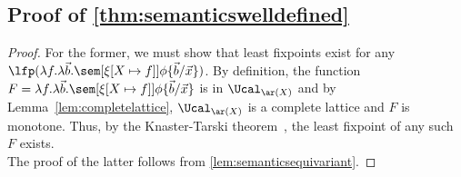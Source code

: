%
\subsection{Proof of \cref{thm:semanticswelldefined}}
\semanticswelldefined*
\begin{proof}
For the former, we must show that least fixpoints exist for any $\lfp(\lambda f.\lambda \vec b.\sem[{\xi[X \mapsto f]}]{\phi\{\vec b/\vec x\}})$. 
By definition, the function $F = \lambda f.\lambda \vec b.\sem[{\xi[X \mapsto f]}]{\phi\{\vec b/\vec x\}}$ is in $\Ucal_{\ar(X)}$ and by Lemma~\ref{lem:completelattice}, $\Ucal_{\ar(X)}$ is a complete lattice and $F$ is monotone. 
Thus, by the Knaster-Tarski theorem~\cite{Tarski}, the least fixpoint of any such $F$ exists.
\\
The proof of the latter follows from \cref{lem:semanticsequivariant}.
\end{proof}
